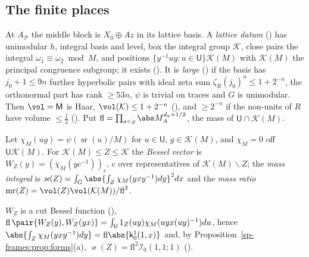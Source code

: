 \subsection{The finite places}\label{sp-frames:ss:finite}

At $A_{\mathcal P}$ the middle block is $X_0\oplus Az$ in its lattice basis. A \emph{lattice datum}
() has unimodular $h$, integral basis and level, box
the integral group $\mathcal K$, close pairs the integral $\omega_1\equiv\omega_2\bmod M$, and
positions $\{y^{-1}uy:u\in\mathsf U\}\mathcal K(M)$ with $\mathcal K(M)$ the principal congruence
subgroup; it exists (). It is \emph{large} ()
if the basis has $j_0+1\le9n$ further hyperbolic pairs with ideal zeta sum $\zeta_R(j_0)^n\le1+2^{-n}$,
the orthonormal part has rank $\ge53n$, $\psi$ is trivial on traces
and $G$ is unimodular. Then $\vol=\mathsf M$ is Haar, $\vol(\mathcal K)\le1+2^{-n}$
(), and $\ge2^{-n}$ if the
non-units of $R$ have volume $\le\frac12$
(). Put
$\mathrm{fl}=\prod_{a<\varrho}\abs M_A^{d_a+1/2}$, the mass of $\mathsf U\cap\mathcal K(M)$.

\begin{definition}
Let $\chi_M(ug)=\psi(\operatorname{sr}(u)/M)$ for $u\in\mathsf U$, $g\in\mathcal K(M)$, and $\chi_M=0$ off
$\mathsf U\mathcal K(M)$. For $\mathcal K(M)\le Z\le\mathcal K$ the \emph{Bessel vector} is
$W_Z(y)=(\chi_M(yc^{-1}))_c$, $c$ over representatives of $\mathcal K(M)\backslash Z$; the
\emph{mass integral} is $\varkappa(Z)=\int_G\abs{\int_Z\chi_M(yxy^{-1})dy}^2dx$ and the \emph{mass
ratio} $\mathrm{mr}(Z)=\vol(Z)\vol(\mathcal K(M))/\mathrm{fl}^2$.
\end{definition}

$W_Z$ is a cut Bessel function (),
$\mathrm{fl}\,\pair{W_Z(y),W_Z(yx)}=\int_{\mathsf U}1_Z(uy)\chi_M(uyx(uy)^{-1})du$, hence
$\abs{\int_Z\chi_M(yxy^{-1})dy}=\mathrm{fl}\abs{\mathsf k^1_0(1,x)}$ and, by
Proposition~\ref{sp-frames:prop:forms}(a), $\varkappa(Z)=\mathrm{fl}^2\mathcal I_0(1,1;1)$
().

